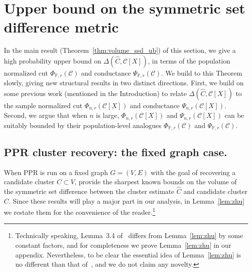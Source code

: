 \documentclass[11pt,twoside]{article}
\newcommand{\1}{\mathbf{1}}
\newcommand{\mc}[1]{\mathcal{#1}}
\newcommand{\Pbb}{\mathbb{P}}
\newcommand{\wh}[1]{\widehat{#1}}
\begin{document}
\section{Upper bound on the symmetric set difference metric}
\label{sec:ub_symmetric_set_difference}

In the main result (Theorem~\ref{thm:volume_ssd_ub}) of this section, we give a high probability upper bound on $\Delta(\wh{C}, \mc{C}[X])$, in terms of the population normalized cut $\Phi_{\Pbb,r}(\mc{C})$ and conductance $\Psi_{\Pbb,r}(\mc{C})$. We build to this Theorem slowly, giving new structural results in two distinct directions. First, we build on some previous work (mentioned in the Introduction) to relate $\Delta(\wh{C}, \mc{C}[X])$ to the sample normalized cut $\Phi_{n,r}(\mc{C}[X])$ and conductance $\Psi_{n,r}(\mc{C}[X])$. Second, we argue that when $n$ is large, $\Phi_{n,r}(\mc{C}[X])$ and $\Psi_{n,r}(\mc{C}[X])$ can be suitably bounded by their population-level analogues $\Phi_{\Pbb,r}(\mc{C})$ and $\Psi_{\Pbb,r}(\mc{C})$.

\subsection{PPR cluster recovery: the fixed graph case.}

When PPR is run on a fixed graph $G = (V,E)$ with the goal of recovering a candidate cluster $C \subset V$, \cite{zhu2013} provide the sharpest known bounds on the volume of the symmetric set difference between the cluster estimate $\wh{C}$ and candidate cluster $C$. Since these results will play a major part in our analysis, in Lemma~\ref{lem:zhu} we restate them for the convenience of the reader.\footnote{Technically speaking, Lemma~3.4 of~\cite{zhu2013} differs from Lemma~\ref{lem:zhu} by some constant factors, and for completeness we prove Lemma~\ref{lem:zhu} in our appendix. Nevertheless, to be clear the essential idea of Lemma~\ref{lem:zhu} is no different than that of~\cite{zhu2013}, and we do not claim any novelty.}
\end{document}
